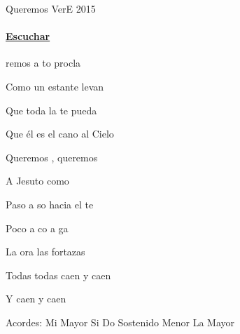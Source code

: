 \documentclass[12pt, spanish]{book}
\begin{document}
    \begin{song}{Queremos Ver}{E}
    {2015} %
    {}
    {} %
    {}
        \ifChordBk
        \paragraph{\mbox{}\hfill\protect\href{https://open.spotify.com/intl-es/track/2t5BcSPWnQK1ufwNvawFHY}{Escuchar}\mbox{}\hfill}
        \fi


        \begin{SBOpGroup}
            remos a to procla

            Como un estante levan

            Que toda la te pueda 

            Que él es el cano al Cielo
        \end{SBOpGroup}

        \begin{SBChorus}
            Queremos , queremos 

            A Jesuto como 
        \end{SBChorus}

        \begin{SBOpGroup}
            Paso a so hacia el te

            Poco a co a ga

            La ora las fortazas

            Todas  todas caen y caen

            Y caen y caen
        \end{SBOpGroup}

        \ifChordBk
        \begin{SBOpGroup}
            Acordes:
            \upchord{\E}\qquad Mi Mayor \hfill
            \upchord{\B}\qquad Si \hfill\null\break
            \upchord{\Csm}\qquad Do Sostenido Menor \hfill
            \upchord{\A}\qquad La Mayor \hfill\null\break
        \end{SBOpGroup}
        \fi

        \begin{SBExtraKeys}{
            \clearpage

}
\end{SBExtraKeys}
\end{song}
\end{document}
